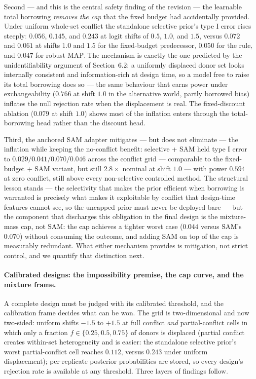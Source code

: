 \documentclass[11pt]{article}
\begin{document}
Second --- and this is the central safety finding of the revision --- the
learnable total borrowing \emph{removes the cap} that the fixed budget had
accidentally provided. Under uniform whole-set conflict the standalone
selective prior's type I error rises steeply: $0.056$, $0.145$, and $0.243$ at
logit shifts of $0.5$, $1.0$, and $1.5$, versus $0.072$ and $0.061$ at shifts
$1.0$ and $1.5$ for the fixed-budget predecessor, $0.050$ for the rule, and
$0.047$ for robust-MAP. The mechanism is exactly the one predicted by the
unidentifiability argument of Section~6.2: a uniformly displaced donor set
looks internally consistent and information-rich at design time, so a model
free to raise its total borrowing does so --- the same behaviour that earns
power under exchangeability ($0.766$ at shift $1.0$ in the alternative world,
partly borrowed bias) inflates the null rejection rate when the displacement
is real. The fixed-discount ablation ($0.079$ at shift $1.0$) shows most of
the inflation enters through the total-borrowing head rather than the
discount head.

Third, the anchored SAM adapter mitigates --- but does not eliminate --- the
inflation while keeping the
no-conflict benefit: selective + SAM held type I error to $0.029/0.041/0.070/
0.046$ across the conflict grid --- comparable to the fixed-budget + SAM
variant, but still $2.8\times$ nominal at shift $1.0$ --- with power $0.594$
at zero conflict, still above every
non-selective controlled method. The structural lesson stands ---
the selectivity that makes the prior efficient when
borrowing is warranted is precisely what makes it exploitable by conflict
that design-time features cannot see, so the uncapped prior must never be
deployed bare --- but the component that discharges this obligation in the
final design is the mixture-mass cap, not SAM: the cap achieves a
tighter worst case ($0.044$ versus SAM's $0.070$) without consuming the
outcome, and adding SAM on top of the cap is measurably redundant. What
either mechanism provides is mitigation, not strict control, and we
quantify that distinction next.

\paragraph{Calibrated designs: the impossibility premise, the cap curve,
and the mixture frame.} A complete design must be judged with its
calibrated threshold, and the calibration frame decides what can be won.
The grid is two-dimensional and now two-sided: uniform shifts $-1.5$ to
$+1.5$ at full conflict \emph{and} partial-conflict cells in which only a
fraction $f \in \{0.25, 0.5, 0.75\}$ of donors is displaced (partial
conflict creates within-set heterogeneity and is easier: the standalone
selective prior's worst partial-conflict cell reaches $0.112$, versus
$0.243$ under uniform displacement); per-replicate posterior probabilities
are stored, so every design's rejection rate is available at any threshold.
Three layers of findings follow.
\end{document}
